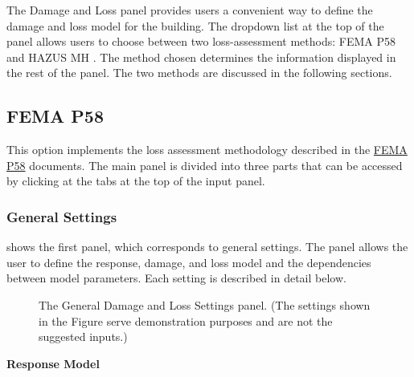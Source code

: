 The Damage and Loss panel provides users a convenient way to define the damage and loss model for the building. The dropdown list at the top of the panel allows users to choose between two loss-assessment methods: FEMA P58 \cite{applied_technology_council_atc_fema_2012} and HAZUS MH \cite{federal_emergency_management_agency_fema_hazus_2018-2}. The method chosen determines the information displayed in the rest of the panel. The two methods are discussed in the following sections.

\subsection{FEMA P58}

This option implements the loss assessment methodology described in the \href{https://www.fema.gov/media-library/assets/documents/90380}{FEMA P58} documents. The main panel is divided into three parts that can be accessed by clicking at the tabs at the top of the input panel.

\subsubsection{General Settings}

 shows the first panel, which corresponds to general settings. The panel allows the user to define the response, damage, and loss model and the dependencies between model parameters. Each setting is described in detail below.

\begin{figure}[!htbp]
  \caption{The General Damage and Loss Settings panel. (The settings shown in the Figure serve demonstration purposes and are not the suggested inputs.)}
  \label{fig:dl_p58_general}
\end{figure}

\textbf{Response Model}

